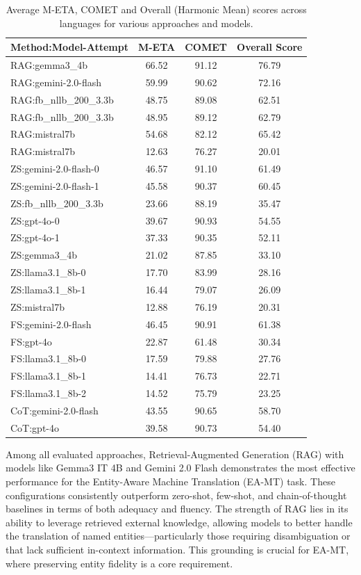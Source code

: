\documentclass[final]{ecai}
\begin{document}
\begin{table}[h!]
\centering
\small %
\label{tab:combined_methods_avg_scores}
\begin{tabular}{|l|c|c|c|}
\hline
\textbf{Method:Model-Attempt} & \textbf{M-ETA} & \textbf{COMET} & \textbf{Overall Score} \\
\hline
RAG:gemma3\_4b & 66.52 & 91.12 & 76.79 \\
RAG:gemini-2.0-flash & 59.99 & 90.62 & 72.16 \\
RAG:fb\_nllb\_200\_3.3b & 48.75 & 89.08 & 62.51 \\
RAG:fb\_nllb\_200\_3.3b & 48.95 & 89.12 & 62.79 \\
RAG:mistral7b & 54.68 & 82.12 & 65.42 \\
RAG:mistral7b & 12.63 & 76.27 & 20.01 \\
\hline
ZS:gemini-2.0-flash-0 & 46.57 & 91.10 & 61.49 \\
ZS:gemini-2.0-flash-1 & 45.58 & 90.37 & 60.45 \\
ZS:fb\_nllb\_200\_3.3b & 23.66 & 88.19 & 35.47 \\
ZS:gpt-4o-0 & 39.67 & 90.93 & 54.55 \\
ZS:gpt-4o-1 & 37.33 & 90.35 & 52.11 \\
ZS:gemma3\_4b & 21.02 & 87.85 & 33.10 \\
ZS:llama3.1\_8b-0 & 17.70 & 83.99 & 28.16 \\
ZS:llama3.1\_8b-1 & 16.44 & 79.07 & 26.09 \\
ZS:mistral7b & 12.88 & 76.19 & 20.31 \\
\hline
FS:gemini-2.0-flash & 46.45 & 90.91 & 61.38 \\
FS:gpt-4o & 22.87 & 61.48 & 30.34 \\
FS:llama3.1\_8b-0 & 17.59 & 79.88 & 27.76 \\
FS:llama3.1\_8b-1 & 14.41 & 76.73 & 22.71 \\
FS:llama3.1\_8b-2 & 14.52 & 75.79 & 23.25 \\
\hline
CoT:gemini-2.0-flash & 43.55 & 90.65 & 58.70 \\
CoT:gpt-4o & 39.58 & 90.73 & 54.40 \\
\hline
\end{tabular}
\caption{Average M-ETA, COMET and Overall (Harmonic Mean) scores across languages for various approaches and models.}
\end{table}

Among all evaluated approaches, Retrieval-Augmented Generation (RAG) with models like Gemma3 IT 4B 
and Gemini 2.0 Flash demonstrates the most effective performance for the Entity-Aware Machine Translation (EA-MT) task. 
These configurations consistently outperform zero-shot, few-shot, and chain-of-thought baselines in terms of both adequacy
and fluency. The strength of RAG lies in its ability to leverage retrieved external knowledge, allowing models to 
better handle the translation of named entities—particularly those requiring disambiguation or that lack sufficient 
in-context information. This grounding is crucial for EA-MT, where preserving entity fidelity is a core requirement.
\end{document}
